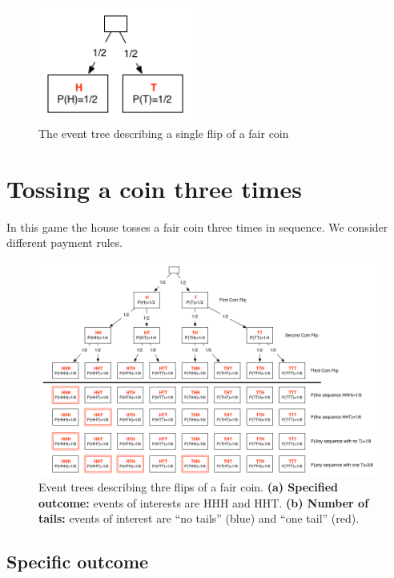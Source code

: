 \begin{figure}[t]
\begin{center}
\includegraphics[width=2in]{figs/EventTree1Coin.png}
\end{center}
\caption{The event tree describing a single flip of a fair coin\label{fig:1Flip}}
\end{figure}

\section{Tossing a coin three times}

In this game the house tosses a fair coin three times in sequence. 
We consider different payment rules.

\begin{figure}[t]
\begin{center}
\includegraphics[width=6in]{figs/EventTree3Coins.png}
\end{center}
\caption{Event trees describing thre flips of a fair coin. {\bf (a)
    Specified outcome:} events of interests are HHH and HHT. {\bf (b)
    Number of tails:} events of interest are ``no tails'' (blue) and
  ``one tail'' (red). \label{fig:3Flips}}
\end{figure}

\subsection{Specific outcome}

